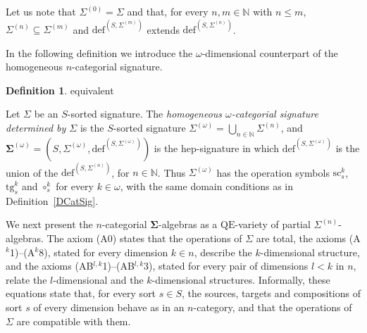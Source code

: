 \documentclass[a4paper, reqno]{amsbook}
\makeatletter
\newcommand{\sig}[1]{\mathbf{#1}}             %
\newcommand{\QE}{\mathrm{QE}}
\newcommand{\src}{\mathrm{sc}}
\newcommand{\tgt}{\mathrm{tg}}
\theoremstyle{plain}
\theoremstyle{definition}
\newtheorem{definition}[theorem]{Definition}
\newcommand*{\CA@leanpending}{}
\newcommand*{\CA@leanrelation}{}
\newcommand*{\lean}[2]{%
  \ifcsname\string\color@lean@#1\endcsname\else
    \PackageError{main}{Unknown relation `#1' in \string\lean}{Use equivalent, weaker or stronger.}%
  \fi
  \gdef\CA@leanrelation{#1}%
  \gdef\CA@leanpending{#2}}
\makeatother
\begin{document}
Let us note that $\Sigma^{(0)}=\Sigma$ and that, for every $n,m\in\mathbb{N}$ with $n\leq m$, $\Sigma^{(n)}\subseteq\Sigma^{(m)}$ and $\mathrm{def}^{(S,\Sigma^{(m)})}$ extends $\mathrm{def}^{(S,\Sigma^{(n)})}$.

In the following definition we introduce the $\omega$-dimensional counterpart of the homogeneous $n$-categorial signature.

\begin{definition}\label{DCatSigOmega}\lean{equivalent}{Homogeneous.epSignature}
Let $\Sigma$ be an $S$-sorted signature.
The \emph{homogeneous $\omega$-categorial signature determined by $\Sigma$} is the $S$-sorted signature $\Sigma^{(\omega)}=\bigcup_{n\in\mathbb{N}}\Sigma^{(n)}$, and $\sig{\Sigma}^{(\omega)}=(S,\Sigma^{(\omega)},\mathrm{def}^{(S,\Sigma^{(\omega)})})$ is the hep-signature in which $\mathrm{def}^{(S,\Sigma^{(\omega)})}$ is the union of the $\mathrm{def}^{(S,\Sigma^{(n)})}$, for $n\in\mathbb{N}$.
Thus $\Sigma^{(\omega)}$ has the operation symbols $\src^{k}_{s}$, $\tgt^{k}_{s}$ and $\circ^{k}_{s}$ for every $k\in\omega$, with the same domain conditions as in Definition~\ref{DCatSig}.
\end{definition}

We next present the $n$-categorial $\sig{\Sigma}$-algebras as a $\QE$-variety of partial $\Sigma^{(n)}$-algebras.
The axiom (A0) states that the operations of $\Sigma$ are total, the axioms (A$^{k}$1)--(A$^{k}$8), stated for every dimension $k\in n$, describe the $k$-dimensional structure, and the axioms (AB$^{l,k}$1)--(AB$^{l,k}$3), stated for every pair of dimensions $l<k$ in $n$, relate the $l$-dimensional and the $k$-dimensional structures.
Informally, these equations state that, for every sort $s\in S$, the sources, targets and compositions of sort $s$ of every dimension behave as in an $n$-category, and that the operations of $\Sigma$ are compatible with them.
\end{document}
